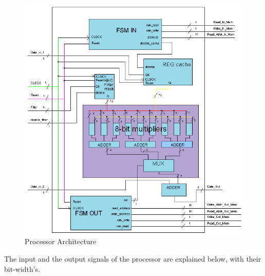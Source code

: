 \documentclass[11pt,a4paper]{article}
\begin{document}
\begin{figure}[h]
	\centering
		\includegraphics[width=6in]{./images/insideproc.PNG}
	\caption{Processor Architecture}	\label{fig:procdetail}
\end{figure}


The input and the output signals of the processor are explained below, with their bit-width's.
\end{document}
